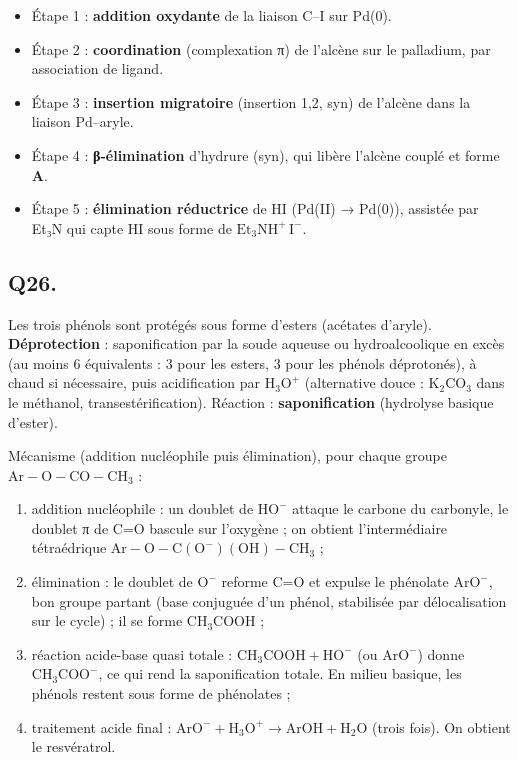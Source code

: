 \documentclass[11pt,a4paper]{article}
\providecommand{\tightlist}{\setlength{\itemsep}{0pt}\setlength{\parskip}{0pt}}
\begin{document}
\begin{itemize}
\tightlist
\item
  Étape 1 : \textbf{addition oxydante} de la liaison C--I sur Pd(0).
\item
  Étape 2 : \textbf{coordination} (complexation π) de l'alcène sur le palladium, par association de ligand.
\item
  Étape 3 : \textbf{insertion migratoire} (insertion 1,2, syn) de l'alcène dans la liaison Pd--aryle.
\item
  Étape 4 : \textbf{β-élimination} d'hydrure (syn), qui libère l'alcène couplé et forme \(\mathbf A\).
\item
  Étape 5 : \textbf{élimination réductrice} de HI (Pd(II) → Pd(0)), assistée par Et₃N qui capte HI sous forme de \(\mathrm{Et_3NH^+\,I^-}\).
\end{itemize}

\hypertarget{q26.}{%
\subsection{Q26.}\label{q26.}}

Les trois phénols sont protégés sous forme d'esters (acétates d'aryle). \textbf{Déprotection} : saponification par la soude aqueuse ou hydroalcoolique en excès (au moins 6 équivalents : 3 pour les esters, 3 pour les phénols déprotonés), à chaud si nécessaire, puis acidification par \(\mathrm{H_3O^+}\) (alternative douce : \(\mathrm{K_2CO_3}\) dans le méthanol, transestérification). Réaction : \textbf{saponification} (hydrolyse basique d'ester).

Mécanisme (addition nucléophile puis élimination), pour chaque groupe \(\mathrm{Ar{-}O{-}CO{-}CH_3}\) :

\begin{enumerate}
\def\labelenumi{\arabic{enumi}.}
\tightlist
\item
  addition nucléophile : un doublet de \(\mathrm{HO^-}\) attaque le carbone du carbonyle, le doublet π de C=O bascule sur l'oxygène ; on obtient l'intermédiaire tétraédrique \(\mathrm{Ar{-}O{-}C(O^-)(OH){-}CH_3}\) ;
\item
  élimination : le doublet de \(\mathrm{O^-}\) reforme C=O et expulse le phénolate \(\mathrm{ArO^-}\), bon groupe partant (base conjuguée d'un phénol, stabilisée par délocalisation sur le cycle) ; il se forme \(\mathrm{CH_3COOH}\) ;
\item
  réaction acide-base quasi totale : \(\mathrm{CH_3COOH}+\mathrm{HO^-}\) (ou \(\mathrm{ArO^-}\)) donne \(\mathrm{CH_3COO^-}\), ce qui rend la saponification totale. En milieu basique, les phénols restent sous forme de phénolates ;
\item
  traitement acide final : \(\mathrm{ArO^-} + \mathrm{H_3O^+} \to \mathrm{ArOH} + \mathrm{H_2O}\) (trois fois). On obtient le resvératrol.
\end{enumerate}
\end{document}
